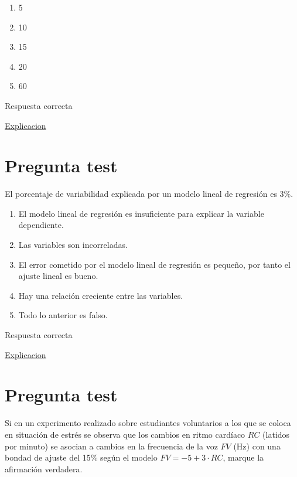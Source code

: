 \documentclass[
]{book}
\providecommand{\tightlist}{%
  \setlength{\itemsep}{0pt}\setlength{\parskip}{0pt}}
\begin{document}
\begin{enumerate}
\def\labelenumi{\alph{enumi})}
\tightlist
\item
  5
\item
  10
\item
  15
\item
  20
\item
  60
\end{enumerate}

Respuesta correcta

\href{https://1fjmanzano.github.io/bioestadistica/relaci\%C3\%B3n-entre-variables-nume\%CC\%81ricas.html\#regresio\%CC\%81n-lineal}{Explicacion}

\hypertarget{pregunta-test-134}{%
\section{Pregunta test}\label{pregunta-test-134}}

El porcentaje de variabilidad explicada por un modelo lineal de regresión es 3\%.

\begin{enumerate}
\def\labelenumi{\alph{enumi})}
\tightlist
\item
  El modelo lineal de regresión es insuficiente para explicar la variable dependiente.
\item
  Las variables son incorreladas.
\item
  El error cometido por el modelo lineal de regresión es pequeño, por tanto el ajuste lineal es bueno.
\item
  Hay una relación creciente entre las variables.
\item
  Todo lo anterior es falso.
\end{enumerate}

Respuesta correcta

\href{https://blog.minitab.com/es/analisis-de-regresion-como-puedo-interpretar-el-r-cuadrado-y-evaluar-la-bondad-de-ajuste}{Explicacion}

\hypertarget{pregunta-test-135}{%
\section{Pregunta test}\label{pregunta-test-135}}

Si en un experimento realizado sobre estudiantes voluntarios a los que se coloca en situación de estrés se observa que los cambios en ritmo cardíaco \(RC\) (latidos por minuto) se asocian a cambios en la frecuencia de la voz \(FV\) (Hz) con una bondad de ajuste del 15\% según el modelo \(FV = -5 + 3 \cdot RC\), marque la afirmación verdadera.
\end{document}
